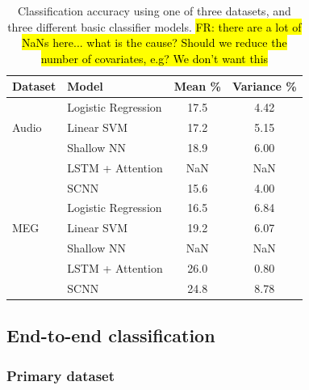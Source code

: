 \documentclass[utf8]{frontiersSCNS} %
\newcommand{\FR}[1]{{\small \textcolor{red}{\hl{FR: #1}}}}
\begin{document}
\begin{table}[t]
  \centering
  \label{tab:feat_results}
  \begin{tabular}{l l | c | c}
    \toprule
    \textbf{Dataset} & \textbf{Model} & \textbf{Mean \%} & \textbf{Variance \%} \\
    \toprule
    \multirow{3}{*}{Audio}
                     & Logistic Regression & 17.5 & 4.42  \\
                     & Linear SVM          & 17.2 & 5.15  \\
                     & Shallow NN          & 18.9 & 6.00  \\
                     & LSTM + Attention    & NaN & NaN  \\
                     & SCNN                & 15.6 & 4.00  \\
    \midrule
    \multirow{3}{*}{MEG}
                     & Logistic Regression & 16.5 & 6.84  \\
                     & Linear SVM          & 19.2 & 6.07  \\
                     & Shallow NN          & NaN & NaN  \\
                     & LSTM + Attention    & 26.0 & 0.80  \\
                     & SCNN                & 24.8 & 8.78  \\
    \bottomrule
  \end{tabular}
  \caption{Classification accuracy using one of three datasets, and three different basic classifier models. \FR{there are a lot of NaNs here... what is the cause? Should we reduce the number of covariates, e.g? We don't want this}}
\end{table}


\subsection{End-to-end classification}

\subsubsection{Primary dataset}
\end{document}
